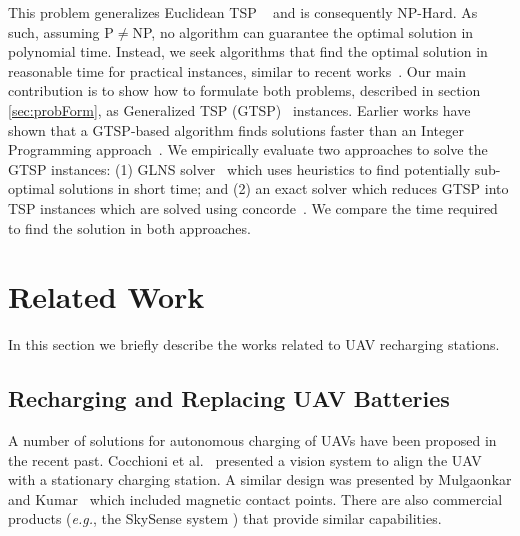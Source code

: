 \documentclass[letterpaper,10pt,conference]{ieeeconf}
\newcommand{\eg}{\textit{e.g.}}
\begin{document}
This problem generalizes Euclidean TSP ~\cite{arora1998polynomial} and is consequently NP-Hard. As such, assuming P$\neq$NP, no algorithm can guarantee the optimal solution in polynomial time. Instead, we seek algorithms that find the optimal solution in reasonable time for practical instances, similar to recent works~\cite{mathew2015multirobot,tokekar2016visibility}. Our main contribution is to show how to formulate both problems, described in section \ref{sec:probForm}, as Generalized TSP (GTSP)~\cite{noon1993efficient} instances. Earlier works have shown that a GTSP-based algorithm finds solutions faster than an Integer Programming approach~\cite{Smith2016GLNS,mathew2015multirobot,tokekar2016visibility}. We empirically evaluate two approaches to solve the GTSP instances: (1) GLNS solver~\cite{Smith2016GLNS} which uses heuristics to find potentially sub-optimal solutions in short time; and (2) an exact solver which reduces GTSP into TSP instances which are solved using concorde~\cite{applegate2006concorde}. We compare the time required to find the solution in both approaches. 


\section{Related Work}
In this section we briefly describe the works related to UAV recharging stations.

\subsection{Recharging and Replacing UAV Batteries}
A number of solutions for autonomous charging of UAVs have been proposed in the recent past. Cocchioni et al.~\cite{cocchioni2014autonomous} presented a vision system to align the UAV with a stationary charging station. %
A similar design was presented by Mulgaonkar and Kumar~\cite{mulgaonkar2014autonomous} which included magnetic contact points. There are also commercial products (\eg, the SkySense system \cite{SkySense.2016}) that provide similar capabilities.
\end{document}
